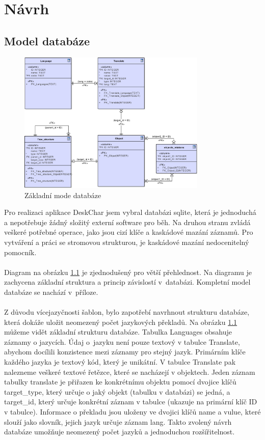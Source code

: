 \documentclass[thesis=B,czech]{resources/FITthesis}[2012/06/26]
\begin{document}
\chapter{Návrh}
	\section{Model databáze}
	\begin{figure}\centering
	\includegraphics[width=0.8\textwidth]{images/database_basic}
	\caption[Základní model databáze]{Základní mode databáze}\label{fig:db_basic}
	\end{figure}
	Pro realizaci aplikace DeskChar jsem vybral databázi sqlite, která je jednoduchá a nepotřebuje žádný složitý externí software pro běh. Na druhou stranu zvládá veškeré potřebné operace, jako jsou cizí klíče a kaskádové mazání záznamů. Pro vytváření a práci se stromovou strukturou, je kaskádové mazání nedocenitelný pomocník. \\
\\
Diagram na obrázku \ref{fig:db_basic} je zjednodušený pro větší přehlednost. Na diagramu je zachycena základní struktura a princip závislostí v~databázi. Kompletní model databáze se nachází v~příloze.\\
\\
Z důvodu vícejazyčnosti šablon, bylo zapotřebí navrhnout strukturu databáze, která dokáže uložit neomezený počet jazykových překladů. Na obrázku \ref{fig:db_basic} můžeme vidět základní strukturu databáze. Tabulka Languages obsahuje záznamy o jazycích. Údaj o~jazyku není pouze textový v tabulce Translate, abychom docílili konzistence mezi záznamy pro stejný jazyk. Primárním klíče každého jazyka je textový kód, který je unikátní. V tabulce Translate pak nalezneme veškeré textové řetězce, které se nacházejí v objektech. Jeden záznam tabulky translate je přiřazen ke konkrétnímu objektu pomocí dvojice klíčů target\_type, který určuje o jaký objekt (tabulku v databázi) se jedná, a target\_id, který určuje konkrétní záznam v tabulce (ukazuje na primární klíč ID v tabulce). Informace o překladu jsou uloženy ve dvojici klíčů name a vulue, které slouží jako slovník, jejich jazyk určuje záznam lang. Takto zvolený návrh databáze umožňuje neomezený počet jazyků a jednoduchou rozšířitelnost.\\
\end{document}
